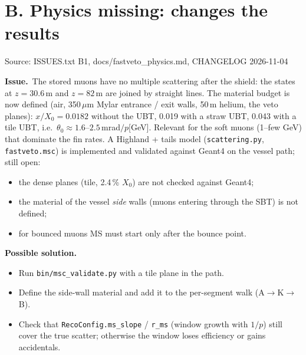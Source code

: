 \documentclass[10pt,a4paper]{article}
\newcommand{\st}[1]{\textbf{#1}}
\newcommand{\stPART}{\textcolor{cernblue}{\st{PARTLY DONE}}}
\newenvironment{issue}[5]{%
  \begin{tcolorbox}[breakable,colback=white,colframe=cernblue,boxrule=0.6pt,arc=1.5mm,
    left=6pt,right=6pt,top=4pt,bottom=4pt,
    title={\textbf{#1}\quad #2\hfill{\normalfont\small priority #3\quad\colorbox{white}{#4}}},
    coltitle=white,colbacktitle=cernblue,fonttitle=\normalsize]
  {\color{greytxt}\footnotesize Source: #5}\par\smallskip}{\end{tcolorbox}\vspace{2pt}}
\newcommand{\prob}{\par\noindent\textbf{\color{cernblue}Issue.}\ }
\newcommand{\sol}{\par\smallskip\noindent\textbf{\color{shorange}Possible solution.}\ }
\begin{document}
\section*{B. Physics missing: changes the results}

\begin{issue}{B1}{Multiple scattering after the shield}{B}{\stPART}{ISSUES.txt B1, docs/fastveto\_physics.md, CHANGELOG 2026-11-04}
\prob The stored muons have no multiple scattering after the shield: the states at $z=30.6$\,m and $z=82$\,m are
joined by straight lines. The material budget is now defined (air, 350\,$\mu$m Mylar entrance / exit walls, 50\,m
helium, the veto planes): $x/X_0=0.0182$ without the UBT, 0.019 with a straw UBT, 0.043 with a tile UBT, i.e.\
$\theta_0\approx1.6$--$2.5$\,mrad$/p$[GeV]. Relevant for the soft muons (1--few GeV) that dominate the fin rates.
A Highland + tails model (\texttt{scattering.py}, \texttt{fastveto.msc}) is implemented and validated against Geant4
on the vessel path; still open:
\begin{itemize}
\item the dense planes (tile, 2.4\,\% $X_0$) are not checked against Geant4;
\item the material of the vessel \emph{side} walls (muons entering through the SBT) is not defined;
\item for bounced muons MS must start only after the bounce point.
\end{itemize}
\sol
\begin{itemize}
\item Run \texttt{bin/msc\_validate.py} with a tile plane in the path.
\item Define the side-wall material and add it to the per-segment walk (A$\to$K$\to$B).
\item Check that \texttt{RecoConfig.ms\_slope} / \texttt{r\_ms} (window growth with $1/p$) still cover the true
      scatter; otherwise the window loses efficiency or gains accidentals.
\end{itemize}
\end{issue}
\end{document}
